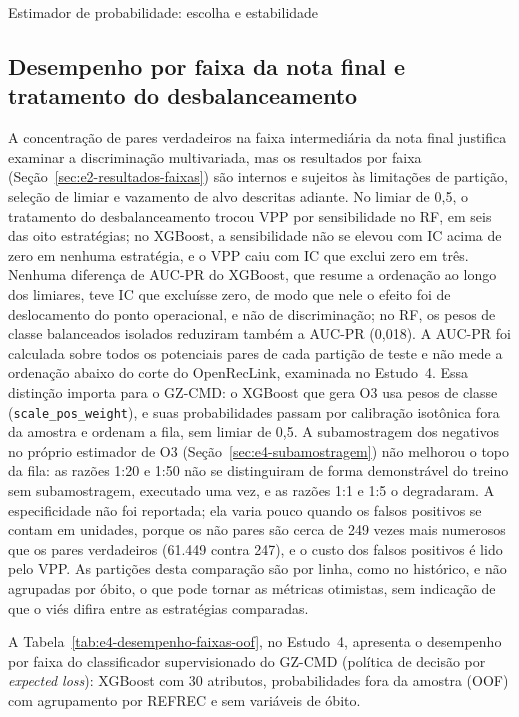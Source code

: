 \begin{chapter}{Estimador de probabilidade: escolha e estabilidade}
\subsection{Desempenho por faixa da nota final e tratamento do desbalanceamento}\label{sec:e2-discussao-faixas}

A concentração de pares verdadeiros na faixa intermediária da nota final justifica examinar a discriminação multivariada, mas os resultados por faixa (Seção~\ref{sec:e2-resultados-faixas}) são internos e sujeitos às limitações de partição, seleção de limiar e vazamento de alvo descritas adiante. No limiar de 0,5, o tratamento do desbalanceamento trocou VPP por sensibilidade no RF, em seis das oito estratégias; no XGBoost, a sensibilidade não se elevou com IC acima de zero em nenhuma estratégia, e o VPP caiu com IC que exclui zero em três. Nenhuma diferença de AUC-PR do XGBoost, que resume a ordenação ao longo dos limiares, teve IC que excluísse zero, de modo que nele o efeito foi de deslocamento do ponto operacional, e não de discriminação; no RF, os pesos de classe balanceados isolados reduziram também a AUC-PR (0,018). A AUC-PR foi calculada sobre todos os potenciais pares de cada partição de teste e não mede a ordenação abaixo do corte do OpenRecLink, examinada no Estudo~4. Essa distinção importa para o GZ-CMD: o XGBoost que gera O3 usa pesos de classe (\texttt{scale\_pos\_weight}), e suas probabilidades passam por calibração isotônica fora da amostra e ordenam a fila, sem limiar de 0,5. A subamostragem dos negativos no próprio estimador de O3 (Seção~\ref{sec:e4-subamostragem}) não melhorou o topo da fila: as razões 1:20 e 1:50 não se distinguiram de forma demonstrável do treino sem subamostragem, executado uma vez, e as razões 1:1 e 1:5 o degradaram. A especificidade não foi reportada; ela varia pouco quando os falsos positivos se contam em unidades, porque os não pares são cerca de 249 vezes mais numerosos que os pares verdadeiros (61.449 contra 247), e o custo dos falsos positivos é lido pelo VPP. As partições desta comparação são por linha, como no histórico, e não agrupadas por óbito, o que pode tornar as métricas otimistas, sem indicação de que o viés difira entre as estratégias comparadas.

A Tabela~\ref{tab:e4-desempenho-faixas-oof}, no Estudo~4, apresenta o desempenho por faixa do classificador supervisionado do GZ-CMD (política de decisão por \textit{expected loss}): XGBoost com 30 atributos, probabilidades fora da amostra (OOF) com agrupamento por REFREC e sem variáveis de óbito.


\end{chapter}
